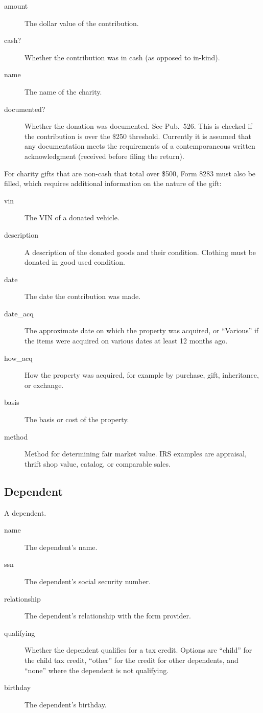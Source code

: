 \begin{description}
\item[amount] The dollar value of the contribution.
\item[cash?] Whether the contribution was in cash (as opposed to in-kind).
\item[name] The name of the charity.
\item[documented?] Whether the donation was documented. See Pub.\ 526. This is
checked if the contribution is over the \$250 threshold. Currently it is assumed
that any documentation meets the requirements of a contemporaneous written
acknowledgment (received before filing the return).
\end{description}
For charity gifts that are non-cash that total over \$500, Form 8283 must also
be filled, which requires additional information on the nature of the gift:
\begin{description}
\item[vin] The VIN of a donated vehicle.
\item[description] A description of the donated goods and their condition.
Clothing must be donated in good used condition.
\item[date] The date the contribution was made.
\item[date\_acq] The approximate date on which the property was acquired, or
``Various'' if the items were acquired on various dates at least 12 months ago.
\item[how\_acq] How the property was acquired, for example by purchase, gift,
inheritance, or exchange.
\item[basis] The basis or cost of the property.
\item[method] Method for determining fair market value. IRS examples are
appraisal, thrift shop value, catalog, or comparable sales.
\end{description}


\subsection{Dependent}

A dependent.

\begin{description}
\item[name] The dependent's name.
\item[ssn] The dependent's social security number.
\item[relationship] The dependent's relationship with the form provider.
\item[qualifying] Whether the dependent qualifies for a tax credit. Options are
``child'' for the child tax credit, ``other'' for the credit for other
dependents, and ``none'' where the dependent is not qualifying.
\item[birthday] The dependent's birthday.
\end{description}


